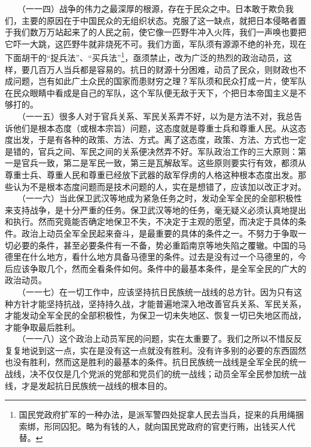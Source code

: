 \documentclass[cn,11pt,chinese]{elegantbook}
\begin{document}
　　（一一四）战争的伟力之最深厚的根源，存在于民众之中。日本敢于欺负我们，主要的原因在于中国民众的无组织状态。克服了这一缺点，就把日本侵略者置于我们数万万站起来了的人民之前，使它像一匹野牛冲入火阵，我们一声唤也要把它吓一大跳，这匹野牛就非烧死不可。我们方面，军队须有源源不绝的补充，现在下面胡干的“捉兵法”、“买兵法”\footnote[42]{ 国民党政府扩军的一种办法，是派军警四处捉拿人民去当兵，捉来的兵用绳捆索绑，形同囚犯。略为有钱的人，就向国民党政府的官吏行贿，出钱买人代替。}，亟须禁止，改为广泛的热烈的政治动员，这样，要几百万人当兵都是容易的。抗日的财源十分困难，动员了民众，则财政也不成问题，岂有如此广土众民的国家而患财穷之理？军队须和民众打成一片，使军队在民众眼睛中看成是自己的军队，这个军队便无敌于天下，个把日本帝国主义是不够打的。\\
　　（一一五）很多人对于官兵关系、军民关系弄不好，以为是方法不对，我总告诉他们是根本态度（或根本宗旨）问题，这态度就是尊重士兵和尊重人民。从这态度出发，于是有各种的政策、方法、方式。离了这态度，政策、方法、方式也一定是错的，官兵之间、军民之间的关系便决然弄不好。军队政治工作的三大原则：第一是官兵一致，第二是军民一致，第三是瓦解敌军。这些原则要实行有效，都须从尊重士兵、尊重人民和尊重已经放下武器的敌军俘虏的人格这种根本态度出发。那些认为不是根本态度问题而是技术问题的人，实在是想错了，应该加以改正才对。\\
　　（一一六）当此保卫武汉等地成为紧急任务之时，发动全军全民的全部积极性来支持战争，是十分严重的任务。保卫武汉等地的任务，毫无疑义必须认真地提出和执行。然而究竟能否确定地保卫不失，不决定于主观的愿望，而决定于具体的条件。政治上动员全军全民起来奋斗，是最重要的具体的条件之一。不努力于争取一切必要的条件，甚至必要条件有一不备，势必重蹈南京等地失陷之覆辙。中国的马德里在什么地方，看什么地方具备马德里的条件。过去是没有过一个马德里的，今后应该争取几个，然而全看条件如何。条件中的最基本条件，是全军全民的广大的政治动员。\\
　　（一一七）在一切工作中，应该坚持抗日民族统一战线的总方针。因为只有这种方针才能坚持抗战，坚持持久战，才能普遍地深入地改善官兵关系、军民关系，才能发动全军全民的全部积极性，为保卫一切未失地区、恢复一切已失地区而战，才能争取最后胜利。\\
　　（一一八）这个政治上动员军民的问题，实在太重要了。我们之所以不惜反反复复地说到这一点，实在是没有这一点就没有胜利。没有许多别的必要的东西固然也没有胜利，然而这是胜利的最基本的条件。抗日民族统一战线是全军全民的统一战线，决不仅仅是几个党派的党部和党员们的统一战线；动员全军全民参加统一战线，才是发起抗日民族统一战线的根本目的。\\
\end{document}
